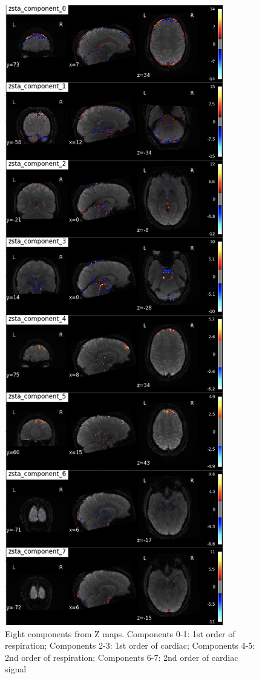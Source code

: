 \begin{figure}[htp]
  \centering
  \includegraphics[width=0.9\columnwidth]{Figures/z-map.jpeg}
  \caption{Eight components from Z maps. Components 0-1: 1st order of respiration; Components 2-3: 1st order of cardiac;
  Components 4-5: 2nd order of respiration; Components 6-7: 2nd order of cardiac signal}
  \label{fig:zmap}
\end{figure} 

